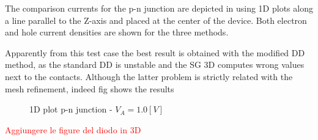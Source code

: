 The comparison currents for the p-n junction are depicted in  using 1D plots along a line parallel to the Z-axis and placed at the center of the device. Both electron and hole current densities are shown for the three methods. 

Apparently from this test case the best result is obtained with the modified DD method, as the standard DD is unstable and the SG 3D computes wrong values next to the contacts. Although the latter problem is strictly related with the mesh refinement, indeed fig shows the results 

  
\begin{figure}[!h]
\centering






\caption{1D plot p-n junction - $V_A=1.0[V]$ }
\label{fig: pn current density 1V}
\end{figure}

\textcolor{red}{Aggiungere le figure del diodo in 3D}



\begin{figure}[!h]
\centering
{}
\end{figure} 





